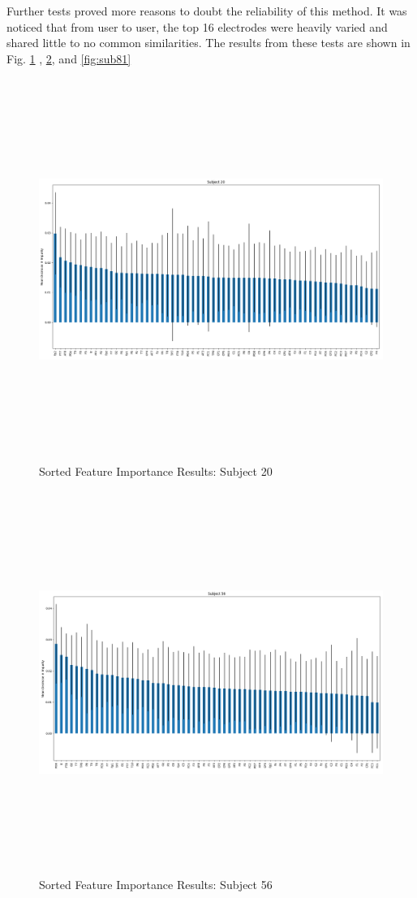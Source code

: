 \documentclass[conference]{IEEEtran}
\begin{document}
    Further tests proved more reasons to doubt the reliability of this method. It was noticed that from user to user, the top 16 electrodes were heavily varied and shared little to no common similarities. The results from these tests are shown in Fig. \ref{fig:sub20} , \ref{fig:sub56}, and \ref{fig:sub81} 

    \onecolumn
    \begin{figure}[htbp]
            \centerline{\includegraphics[height=4.9in, keepaspectratio, angle=270]{figs/F/sub20_feat_import.png}}
            \caption{Sorted Feature Importance Results: Subject 20}
            \label{fig:sub20}
    \end{figure} 
    \begin{figure}[htbp]
            \centerline{\includegraphics[height=4.9in, keepaspectratio, angle=270]{figs/F/sub56_feat_import.png}}
            \caption{Sorted Feature Importance Results: Subject 56}
            \label{fig:sub56}
    \end{figure} 
\end{document}

